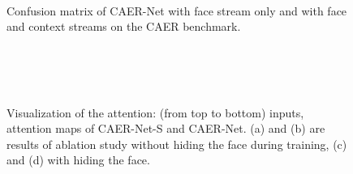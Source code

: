 \documentclass[10pt,twocolumn,letterpaper]{article}
\begin{document}
\begin{figure}
	\centering
	\renewcommand{\thesubfigure}{}
	\hfill
	\hfill\\
	\caption{Confusion matrix of CAER-Net with face stream only and with face and context streams on the CAER benchmark.}
	\label{fig:7}\vspace{-8pt}
\end{figure}


\begin{figure}
	\centering
	\renewcommand{\thesubfigure}{}
	\hfill
	\hfill
	\hfill
	\hfill\\
    \vspace{-10pt}
	\hfill
	\hfill
	\hfill
	\hfill\\
    \vspace{-10pt}
	\hfill
	\hfill
	\hfill
	\hfill\\
	\vspace{-3pt}
	\caption{Visualization of the attention: (from top to bottom) inputs, attention maps of CAER-Net-S and CAER-Net. (a) and (b) are results of ablation study without hiding the face during training, (c) and (d) with hiding the face.}
	\label{fig:10}\vspace{-10pt}
\end{figure}
\end{document}

